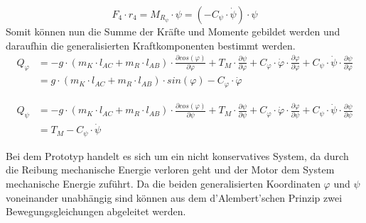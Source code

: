 \begin{equation}
F_4 \cdot r_4 = M_{R_{\psi}} \cdot \psi = (-C_{\psi} \cdot \dot{\psi}) \cdot \psi
\end{equation}
Somit können nun die Summe der Kräfte und Momente gebildet werden und daraufhin die generalisierten Kraftkomponenten bestimmt werden.
\begin{equation}
\begin{split}
Q_{\varphi} &= -g \cdot (m_K \cdot l_{AC} + m_R \cdot l_{AB}) \cdot \frac{\partial cos(\varphi)}{\partial \varphi} + T_M \cdot \frac{\partial \psi}{\partial \varphi} + C_{\varphi} \cdot \dot{\varphi} \cdot \frac{\partial \varphi}{\partial \varphi} + C_{\psi} \cdot \dot{\psi} \cdot \frac{\partial \psi}{\partial \varphi} \\
&= g \cdot (m_K \cdot l_{AC} + m_R \cdot l_{AB})\cdot sin(\varphi) - C_{\varphi} \cdot \dot{\varphi}
\end{split}
\end{equation}

\begin{equation}
\begin{split}
Q_{\psi} &= -g \cdot (m_K \cdot l_{AC} + m_R \cdot l_{AB}) \cdot \frac{\partial cos(\varphi)}{\partial \psi} + T_M \cdot \frac{\partial \psi}{\partial \psi} + C_{\varphi} \cdot \dot{\varphi} \cdot \frac{\partial \varphi}{\partial \psi} + C_{\psi} \cdot \dot{\psi} \cdot \frac{\partial \psi}{\partial \psi} \\
&= T_M - C_{\psi} \cdot \dot{\psi}
\end{split}
\end{equation}

Bei dem Prototyp handelt es sich um ein nicht konservatives System, da durch die Reibung mechanische Energie verloren geht und der Motor dem System mechanische Energie zuführt. Da die beiden generalisierten Koordinaten $\varphi$ und $\psi$ voneinander unabhängig sind können aus dem d'Alembert'schen Prinzip zwei Bewegungsgleichungen abgeleitet werden.

